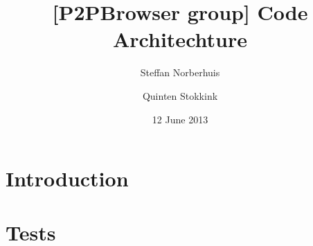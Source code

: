 \documentclass[a4paper,11pt]{article}
\title{[P2PBrowser group] Code Architechture}
\author{Steffan Norberhuis \and Quinten Stokkink}
\date{12 June 2013}
\begin{document}
   \maketitle

\section{Introduction}

\section{Tests}

\end{document}
